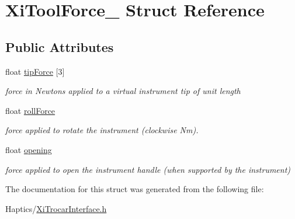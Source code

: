 \hypertarget{structXiToolForce__}{
\section{XiToolForce\_\- Struct Reference}
\label{structXiToolForce__}
}
\subsection*{Public Attributes}
\begin{DoxyCompactItemize}
\item 
\hypertarget{structXiToolForce___a008f7de991257f16f38a71063f91bf51}{
float \hyperlink{structXiToolForce___a008f7de991257f16f38a71063f91bf51}{tipForce} \mbox{[}3\mbox{]}}
\label{structXiToolForce___a008f7de991257f16f38a71063f91bf51}

\begin{DoxyCompactList}\small\item\em force in Newtons applied to a virtual instrument tip of unit length \item\end{DoxyCompactList}\item 
\hypertarget{structXiToolForce___afaadb8fd6a551420fda1f2ddc716ce37}{
float \hyperlink{structXiToolForce___afaadb8fd6a551420fda1f2ddc716ce37}{rollForce}}
\label{structXiToolForce___afaadb8fd6a551420fda1f2ddc716ce37}

\begin{DoxyCompactList}\small\item\em force applied to rotate the instrument (clockwise Nm). \item\end{DoxyCompactList}\item 
\hypertarget{structXiToolForce___a8213ec1d1fe1b8c86a40ad7731c55f07}{
float \hyperlink{structXiToolForce___a8213ec1d1fe1b8c86a40ad7731c55f07}{opening}}
\label{structXiToolForce___a8213ec1d1fe1b8c86a40ad7731c55f07}

\begin{DoxyCompactList}\small\item\em force applied to open the instrument handle (when supported by the instrument) \item\end{DoxyCompactList}\end{DoxyCompactItemize}


The documentation for this struct was generated from the following file:\begin{DoxyCompactItemize}
\item 
Haptics/\hyperlink{XiTrocarInterface_8h}{XiTrocarInterface.h}\end{DoxyCompactItemize}
